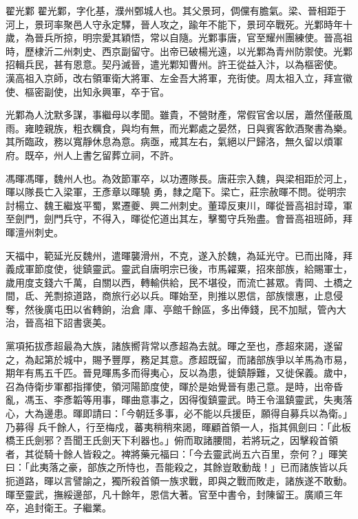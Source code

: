 
\begin{pinyinscope}

 翟光鄴
 翟光鄴，字化基，濮州鄄城人也。其父景珂，倜儻有膽氣。梁、晉相距于河上，景珂率聚邑人守永定驛，晉人攻之，踰年不能下，景珂卒戰死。光鄴時年十歲，為晉兵所掠，明宗愛其穎悟，常以自隨。光鄴事唐，官至耀州團練使。晉高祖時，歷棣沂二州刺史、西京副留守。出帝已破楊光遠，以光鄴為青州防禦使。光鄴招輯兵民，甚有恩意。契丹滅晉，遣光鄴知曹州。許王從益入汴，以為樞密使。
 漢高祖入京師，改右領軍衛大將軍、左金吾大將軍，充街使。周太祖入立，拜宣徽使、樞密副使，出知永興軍，卒于官。



 光鄴為人沈默多謀，事繼母以孝聞。雖貴，不營財產，常假官舍以居，蕭然僅蔽風雨。雍睦親族，粗衣糲食，與均有無，而光鄴處之晏然，日與賓客飲酒聚書為樂。其所臨政，務以寬靜休息為意。病亟，戒其左右，氣絕以尸歸洛，無久留以煩軍府。既卒，州人上書乞留葬立祠，不許。



 馮暉馮暉，魏州人也。為效節軍卒，以功遷隊長。唐莊宗入魏，與梁相距於河上，暉以隊長亡入梁軍，王彥章以暉驍
 勇，隸之麾下。梁亡，莊宗赦暉不問。從明宗討楊立、魏王繼岌平蜀，累遷夔、興二州刺史。董璋反東川，暉從晉高祖討璋，軍至劍門，劍門兵守，不得入，暉從佗道出其左，擊蜀守兵殆盡。會晉高祖班師，拜暉澶州刺史。



 天福中，範延光反魏州，遣暉襲滑州，不克，遂入於魏，為延光守。已而出降，拜義成軍節度使，徙鎮靈武。靈武自唐明宗已後，市馬糴粟，招來部族，給賜軍士，歲用度支錢六千萬，自關以西，轉輸供給，民不堪役，而流亡甚眾。青岡、土橋之間，氐、羌剽掠道路，商旅行必以兵。暉始至，則推以恩信，部族懷惠，止息侵奪，然後廣屯田以省轉餉，治倉
 庫、亭館千餘區，多出俸錢，民不加賦，管內大治，晉高祖下詔書褒美。



 黨項拓拔彥超最為大族，諸族嚮背常以彥超為去就。暉之至也，彥超來謁，遂留之，為起第於城中，賜予豐厚，務足其意。彥超既留，而諸部族爭以羊馬為市易，期年有馬五千匹。晉見暉馬多而得夷心，反以為患，徙鎮靜難，又徙保義。歲中，召為侍衛步軍都指揮使，領河陽節度使，暉於是始覺晉有患己意。是時，出帝昏亂，馮玉、李彥韜等用事，暉曲意事之，因得復鎮靈武。時王令溫鎮靈武，失夷落心，大為邊患。暉即請曰：「今朝廷多事，必不能以兵援臣，願得自募兵以為衛。」乃募得
 兵千餘人，行至梅戍，蕃夷稍稍來謁，暉顧首領一人，指其佩劍曰：「此板橋王氏劍邪？吾聞王氏劍天下利器也。」俯而取諸腰間，若將玩之，因擊殺首領者，其從騎十餘人皆殺之。裨將藥元福曰：「今去靈武尚五六百里，奈何？」暉笑曰：「此夷落之豪，部族之所恃也，吾能殺之，其餘豈敢動哉！」已而諸族皆以兵扼道路，暉以言譬諭之，獨所殺首領一族求戰，即與之戰而敗走，諸族遂不敢動。暉至靈武，撫綏邊部，凡十餘年，恩信大著。官至中書令，封陳留王。廣順三年卒，追封衛王。子繼業。




\end{pinyinscope}
